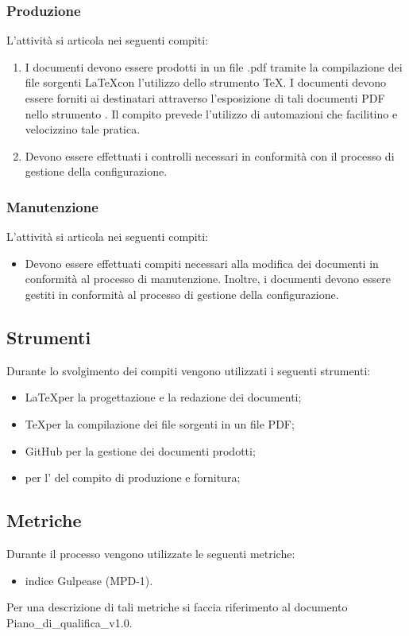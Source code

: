 \subsubsection{Produzione}
L'attività si articola nei seguenti compiti:
\begin{enumerate}
    \item I documenti devono essere prodotti in un file .pdf tramite la compilazione dei file sorgenti \LaTeX con l'utilizzo dello strumento \TeX. I documenti devono essere forniti ai destinatari attraverso l'esposizione di tali documenti PDF nello strumento . Il compito prevede l'utilizzo di automazioni che facilitino e velocizzino tale pratica.
    \item Devono essere effettuati i controlli necessari in conformità con il processo di gestione della configurazione.
\end{enumerate}
\newpage
\subsubsection{Manutenzione}
L'attività si articola nei seguenti compiti:
\begin{itemize}
    \item Devono essere effettuati compiti necessari alla modifica dei documenti in conformità al processo di manutenzione. Inoltre, i documenti devono essere gestiti in conformità al processo di gestione della configurazione.
\end{itemize}

\subsection{Strumenti}
Durante lo svolgimento dei compiti vengono utilizzati i seguenti strumenti:
\begin{itemize}
    \item \LaTeX per la progettazione e la redazione dei documenti;
    \item \TeX per la compilazione dei file sorgenti in un file PDF;
    \item GitHub per la gestione dei documenti prodotti;
    \item {} per l' del compito di produzione e fornitura;
\end{itemize}

\subsection{Metriche}
Durante il processo vengono utilizzate le seguenti metriche:
\begin{itemize}
    \item indice Gulpease (MPD-1).
\end{itemize}
Per una descrizione di tali metriche si faccia riferimento al documento Piano\_di\_qualifica\_v1.0.
\newpage

